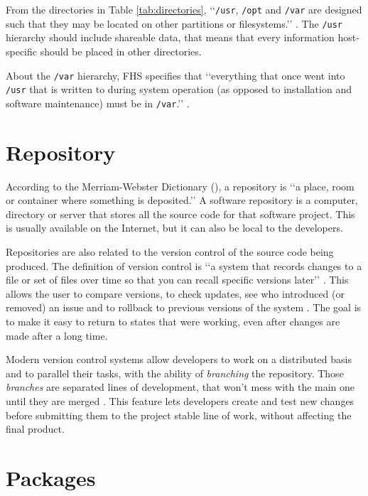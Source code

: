 From the directories in Table \ref{tab:directories}, \lq\lq \texttt{/usr}, \texttt{/opt} and \texttt{/var} are designed such that they may be located on other partitions or filesystems.\rq\rq{} \cite[p. 3]{allbery2015filesystem}. The \texttt{/usr} hierarchy should include shareable data, that means that every information host-specific should be placed in other directories.

About the \texttt{/var} hierarchy, FHS specifies that \lq\lq everything that once went into \texttt{/usr} that is written to during system operation (as opposed to installation and software maintenance) must be in \texttt{/var}.\rq\rq{}  \cite[p. 30]{allbery2015filesystem}.


\section{Repository}
\label {sec:repository}

According to the Merriam-Webster Dictionary (\citeyear{webster2017repository}), a repository is \lq\lq a place, room or container where something is deposited.\rq\rq{} A software repository is a computer, directory or server that stores all the source code for that software project. This is usually available on the Internet, but it can also be local to the developers.

Repositories are also related to the version control of the source code being produced. The definition of version control is \lq\lq a system that records changes to a file or set of files over time so that you can recall specific versions later\rq\rq{} \cite{chacon2014pro}. This allows the user to compare versions, to check updates, see who introduced (or removed) an issue and to rollback to previous versions of the system \cite{chacon2014pro}. The goal is to make it easy to return to states that were working, even after changes are made after a long time.

Modern version control systems allow developers to work on a distributed basis and to parallel their tasks, with the ability of \textit{branching} the repository. Those \textit{branches} are separated lines of development, that won't mess with the main one until they are merged \cite{chacon2014pro}. This feature lets developers create and test new changes before submitting them to the project stable line of work, without affecting the final product.

\section{Packages}
\label {sec:packages}

